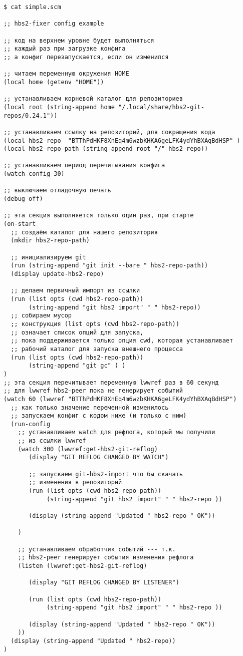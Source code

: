 \documentclass[11pt,a4paper]{article}
\begin{document}
\begin{verbatim}
$ cat simple.scm

;; hbs2-fixer config example

;; код на верхнем уровне будет выполняться
;; каждый раз при загрузке конфига
;; а конфиг перезапускается, если он изменился

;; читаем переменную окружения HOME
(local home (getenv "HOME"))

;; устанавливаем корневой каталог для репозиториев
(local root (string-append home "/.local/share/hbs2-git-repos/0.24.1"))

;; устанавливаем ссылку на репозиторий, для сокращения кода
(local hbs2-repo  "BTThPdHKF8XnEq4m6wzbKHKA6geLFK4ydYhBXAqBdHSP" )
(local hbs2-repo-path (string-append root "/" hbs2-repo))

;; устанавливаем период перечитывания конфига
(watch-config 30)

;; выключаем отладочную печать
(debug off)

;; эта секция выполняется только один раз, при старте
(on-start
  ;; создаём каталог для нашего репозитория
  (mkdir hbs2-repo-path)

  ;; инициализируем git
  (run (string-append "git init --bare " hbs2-repo-path))
  (display update-hbs2-repo)

  ;; делаем первичный импорт из ссылки
  (run (list opts (cwd hbs2-repo-path))
       (string-append "git hbs2 import" " " hbs2-repo))
  ;; собираем мусор
  ;; конструкция (list opts (cwd hbs2-repo-path))
  ;; означает список опций для запуска,
  ;; пока поддерживается только опция cwd, которая устанавливает
  ;; рабочий каталог для запуска внешнего процесса
  (run (list opts (cwd hbs2-repo-path))
       (string-append "git gc" ) )
)
;; эта секция перечитывает переменную lwwref раз в 60 секунд
;; для lwwref hbs2-peer пока не генерирует событий
(watch 60 (lwwref "BTThPdHKF8XnEq4m6wzbKHKA6geLFK4ydYhBXAqBdHSP")
  ;; как только значение переменной изменилось
  ;; запускаем конфиг с кодом ниже (и только с ним)
  (run-config
    ;; устанавливаем watch для рефлога, который мы получили
    ;; из ссылки lwwref
    (watch 300 (lwwref:get-hbs2-git-reflog)
       (display "GIT REFLOG CHANGED BY WATCH")

       ;; запускаем git-hbs2-import что бы скачать
       ;; изменения в репозиторий
       (run (list opts (cwd hbs2-repo-path))
            (string-append "git hbs2 import" " " hbs2-repo ))

       (display (string-append "Updated " hbs2-repo " OK"))

    )

    ;; устанавливаем обработчик событий --- т.к.
    ;; hbs2-peer генерирует события изменения рефлога
    (listen (lwwref:get-hbs2-git-reflog)

       (display "GIT REFLOG CHANGED BY LISTENER")

       (run (list opts (cwd hbs2-repo-path))
            (string-append "git hbs2 import" " " hbs2-repo ))

       (display (string-append "Updated " hbs2-repo " OK"))
    ))
  (display (string-append "Updated " hbs2-repo))
)

\end{verbatim}
\end{document}
